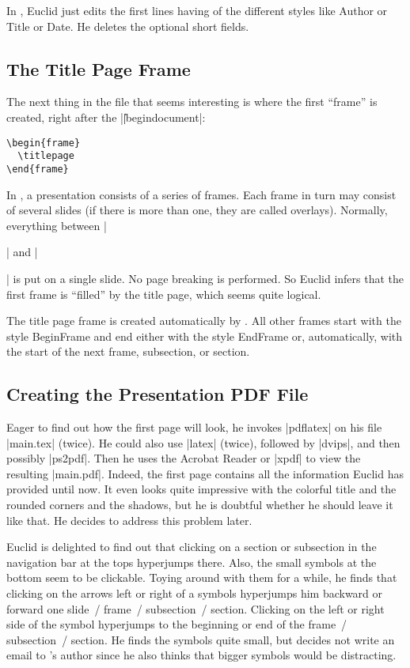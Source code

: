 \lyxnote
In \LyX, Euclid just edits the first lines having of the different
styles like Author or Title or Date. He deletes the optional short
fields.


\subsection{The Title Page Frame}

The next thing in the file that seems interesting is where the first
``frame'' is created, right after the |\||begin{document}|:

\begin{verbatim}
\begin{frame}
  \titlepage
\end{frame}
\end{verbatim}

In \beamer, a presentation consists of a series of frames. Each frame
in turn may consist of several slides (if there is more than one, they
are called overlays). Normally, everything between |\begin{frame}|
  and |\end{frame}| is put on a single slide. No page breaking is
performed. So Euclid infers that the first frame is ``filled'' by the
title page, which seems quite logical.

\lyxnote
The title page frame is created automatically by \LyX. All other
frames start with the style BeginFrame and end either with the style
EndFrame or, automatically, with the start of the next frame,
subsection, or section. 


\subsection{Creating the Presentation PDF File}

Eager to find out how the first page will
look, he invokes |pdflatex| on his file |main.tex| (twice). He could
also use |latex| (twice), followed by |dvips|, and then possibly
|ps2pdf|. Then he uses the Acrobat Reader or |xpdf| to view the
resulting |main.pdf|. Indeed, the first page contains all the
information Euclid has provided until now. It even looks quite
impressive with the colorful title and the rounded corners and the
shadows, but he is doubtful whether he should leave it like that. He
decides to address this problem later.

Euclid is delighted to find out that clicking on a section or
subsection in the navigation bar at the tops hyperjumps there. Also,
the small symbols at the bottom seem to be clickable. Toying around
with them for a while, he finds that clicking on the arrows left or
right of a symbols hyperjumps him backward or forward one slide~/
frame~/ subsection~/ section. Clicking on the left or right side of
the symbol hyperjumps to the beginning or end of the frame~/
subsection~/ section. He finds the symbols quite small, but decides
not write an email to \beamer's author since he also thinks that
bigger symbols would be distracting.

